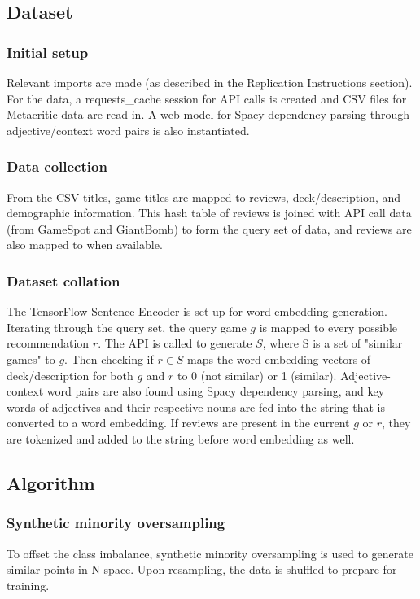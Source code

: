 \documentclass[10pt,twocolumn]{article}
\begin{document}
\subsection{Dataset}

\subsubsection{Initial setup}
Relevant imports are made (as described in the Replication Instructions section). For the data, a requests\_cache session for API calls is created and CSV files for Metacritic data are read in. A web model for Spacy dependency parsing through adjective/context word pairs is also instantiated.

\subsubsection{Data collection}
From the CSV titles, game titles are mapped to reviews, deck/description, and demographic information. This hash table of reviews is joined with API call data (from GameSpot and GiantBomb) to form the query set of data, and reviews are also mapped to when available.

\subsubsection{Dataset collation}
The TensorFlow Sentence Encoder is set up for word embedding generation. Iterating through the query set, the query game $g$ is mapped to every possible recommendation $r$. The API is called to generate $S$, where S is a set of "similar games" to $g$. Then checking if $r \in S$ maps the word embedding vectors of deck/description for both $g$ and $r$ to 0 (not similar) or 1 (similar). Adjective-context word pairs are also found using Spacy dependency parsing, and key words of adjectives and their respective nouns are fed into the string that is converted to a word embedding. If reviews are present in the current $g$ or $r$, they are tokenized and added to the string before word embedding as well.

\subsection{Algorithm}

\subsubsection{Synthetic minority oversampling}
To offset the class imbalance, synthetic minority oversampling \cite{NVChawla} is used to generate similar points in N-space. Upon resampling, the data is shuffled to prepare for training.
\end{document}
